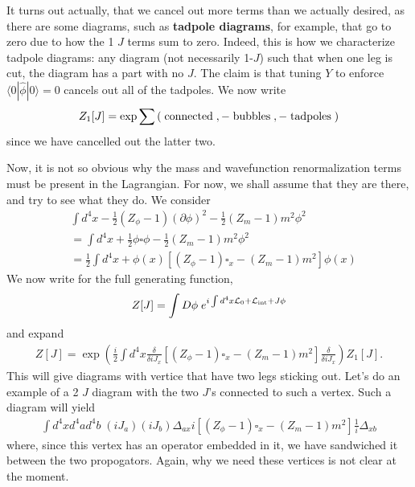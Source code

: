 \documentclass{../mathnotes}
\begin{document}
It turns out actually, that we cancel out more terms than we actually desired, as there are some diagrams, such as \textbf{tadpole diagrams},
for example, that go to zero due to how the 1 $J$ terms sum to zero. Indeed, this is how we characterize tadpole diagrams: any diagram
(not necessarily 1-$J$) such that when one leg is cut, the diagram has a part with no $J$. The claim is that tuning $Y$ to enforce
$\langle 0|\hat\phi|0\rangle=0$ cancels out all of the tadpoles.
We now write
\begin{align*}
    Z_1[J]=\exp\sum\left( \;\textnormal{connected}\;, -\;\textnormal{bubbles}\;,-\;\textnormal{tadpoles}\;\right)
\end{align*}
since we have cancelled out the latter two.

Now, it is not so obvious why the mass and wavefunction renormalization terms must be present in the Lagrangian. For now, we shall assume that
they are there, and try to see what they do. We consider
\begin{align*}
    &\int d^4x -\frac{1}{2}(Z_\phi-1)(\partial\phi)^2-\frac{1}{2}(Z_m-1)m^2\phi^2\\
    &=\int d^4x +\frac{1}{2}\phi\square\phi-\frac{1}{2}(Z_m-1)m^2\phi^2\\
    &=\frac{1}{2}\int d^4x +\phi(x)\left[ (Z_\phi-1)\square_x-(Z_m-1)m^2 \right]\phi(x)
\end{align*}
We now write for the full generating function,
\begin{align*}
    Z[J]=\int D\phi\; e^{i\int d^4x \mathcal{L}_0+\mathcal{L}_{\rm int}+J\phi}
\end{align*}
and expand
\begin{align*}
    Z[J]=\exp\left( \frac{i}{2}\int d^4x\frac{\delta}{\delta iJ_x}\left[ (Z_\phi-1)\square_x-(Z_m-1)m^2 \right]\frac{\delta}{\delta iJ_x} \right)Z_1[J].
\end{align*}
This will give diagrams with vertice that have two legs sticking out. Let's do an example of a 2 $J$ diagram with the two $J$'s connected
to such a vertex. Such a diagram will yield
\begin{align*}
    \int d^4xd^4ad^4b\;(iJ_a)(iJ_b)\Delta_{ax}i\left[ (Z_\phi-1)\square_x-(Z_m-1)m^2 \right]\frac{1}{i}\Delta_{xb}
\end{align*}
where, since this vertex has an operator embedded in it, we have sandwiched it between the two propogators. Again, why we need these
vertices is not clear at the moment.
\end{document}
